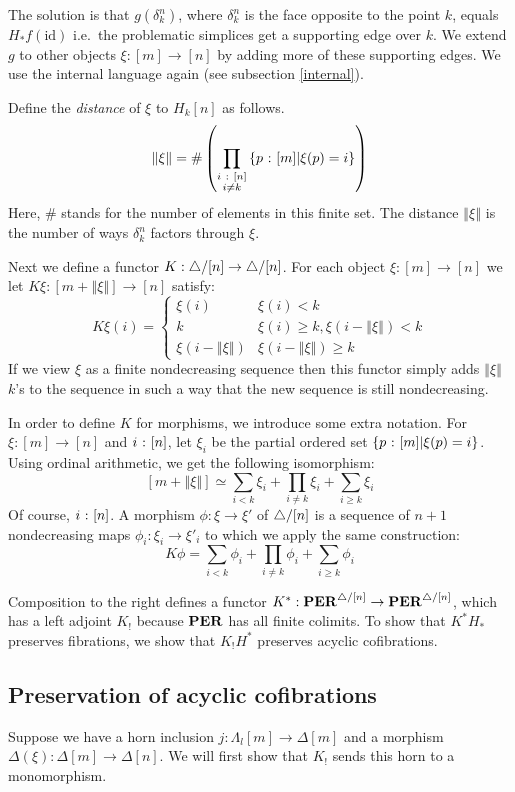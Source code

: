 \documentclass{amsart}
\theoremstyle{plain}
\theoremstyle{definition}
\newcommand\hide[1]{}
\newcommand\set[1]{\left\{#1\right\}}
\newcommand\id{\mathrm{id}}
\begin{document}
\newcommand\norm[1]{\left\Vert#1\right\Vert}
The solution is that $g(\delta^n_{k})$, where $\delta^n_k$ is the face opposite to the point $k$, equals $H_*f(\id)$ i.e.\ the problematic simplices get a supporting edge over $k$. We extend $g$ to other objects $\xi:[m]\to[n]$ by adding more of these supporting edges. We use the internal language again (see subsection \ref{internal}).

Define the \emph{distance} of $\xi$ to $H_k[n]$ as follows.
\[ \norm\xi = \#\left( \prod_{\substack{i\of [n]\\i\neq k}}\set{p\of [m]|\xi(p)=i}\right)\]
Here, $\#$ stands for the number of elements in this finite set. The distance $\norm\xi$ is the number of ways $\delta^n_k$ factors through $
\xi$.

Next we define a functor $K:{\mathord{\triangle}}/[n]\to{\mathord{\triangle}}/[n]$. For each object $\xi:[m]\to[n]$ we let $K\xi:[m+\norm\xi]\to[n]$ satisfy:
\[ K\xi(i) = \left\{ \begin{array}{cl} 
\xi(i) & \xi(i)<k\\
k & \xi(i)\geq k, \xi(i-\norm\xi)<k\\
\xi(i-\norm\xi) & \xi(i-\norm\xi)\geq k
\end{array}\right.\]
If we view $\xi$ as a finite nondecreasing sequence then this functor simply adds $\norm\xi$ $k$'s to the sequence in such a way that the new sequence is still nondecreasing.

\hide{Symmetrie in de definitie is wel leuk, maar splitsen maakt het product te klein.}
In order to define $K$ for morphisms, we introduce some extra notation. For $\xi:[m]\to[n]$ and $i\mathord{\ :\ }[n]$, let $\xi_i$ be the partial ordered set $\set{p\of[m]|\xi(p)=i}$. Using ordinal arithmetic, we get the following isomorphism:
\[ [m+\norm\xi] \simeq \sum_{i<k} \xi_i+\prod_{i\neq k}\xi_i+\sum_{i\geq k} \xi_i\]
Of course, $i\mathord{\ :\ }[n]$. A morphism $\phi:\xi\to\xi'$ of ${\mathord{\triangle}}/[n]$ is a sequence of $n+1$ nondecreasing maps $\phi_i:\xi_i\to\xi'_i$ to which we apply the same construction:
\[ K\phi = \sum_{i<k} \phi_i+\prod_{i\neq k}\phi_i+
\sum_{i\geq k} \phi_i \]

Composition to the right defines a functor $K^*:\mathbf{PER}^{{\mathord{\triangle}}/[n]}\to\mathbf{PER}^{{\mathord{\triangle}}/[n]}$, which has a left adjoint $K_!$ because $\mathbf{PER}$ has all finite colimits.
To show that $K^*H_*$ preserves fibrations, we show that $K_!H^*$ preserves acyclic cofibrations.

\subsection{Preservation of acyclic cofibrations}
Suppose we have a horn inclusion $j:\Lambda_l[m] \to \Delta[m]$ and a morphism $\Delta(\xi):\Delta[m] \to\Delta[n]$. We will first show that $K_!$ sends this horn to a monomorphism.
\end{document}
